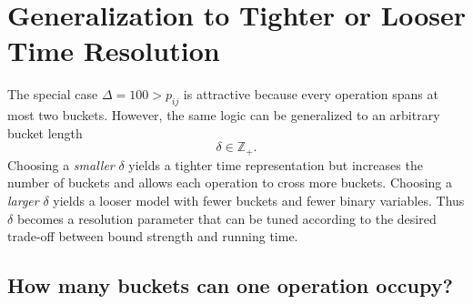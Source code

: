 \documentclass[11pt]{article}
\begin{document}



\clearpage

\section{Generalization to Tighter or Looser Time Resolution}
\label{sec:generalization}

The special case $\Delta=100>p_{ij}$ is attractive because every operation spans at most two buckets.
However, the same logic can be generalized to an arbitrary bucket length
\[
\delta\in\mathbb Z_{+}.
\]
Choosing a \emph{smaller} $\delta$ yields a tighter time representation but increases the number of buckets and allows each operation to cross more buckets.
Choosing a \emph{larger} $\delta$ yields a looser model with fewer buckets and fewer binary variables.
Thus $\delta$ becomes a resolution parameter that can be tuned according to the desired trade-off between bound strength and running time.

\subsection{How many buckets can one operation occupy?}
\end{document}
